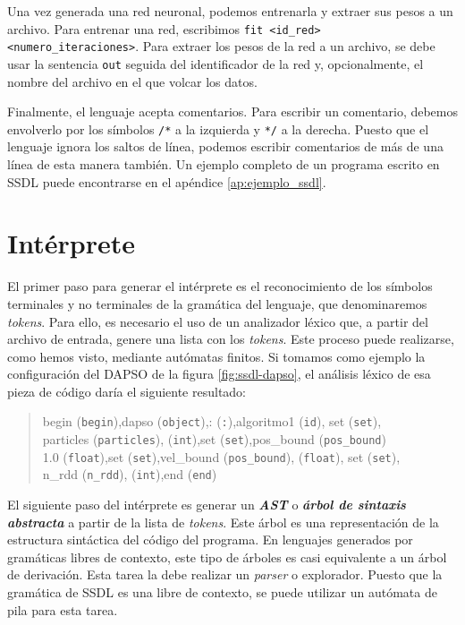 \vspace{10pt}
Una vez generada una red neuronal, podemos entrenarla y extraer sus pesos a un archivo. Para entrenar una red,
escribimos \texttt{fit <id\_red> <numero\_iteraciones>}. Para extraer los pesos de la red a un archivo, se debe
usar la sentencia \texttt{out} seguida del identificador de la red y, opcionalmente, el nombre del archivo en el
que volcar los datos.

\vspace{10pt}
Finalmente, el lenguaje acepta comentarios. Para escribir un comentario, debemos envolverlo por los símbolos
\texttt{/*} a la izquierda y \texttt{*/} a la derecha. Puesto que el lenguaje ignora los saltos de línea, podemos
escribir comentarios de más de una línea de esta manera también. Un ejemplo completo de un programa escrito en
SSDL puede encontrarse en el apéndice \ref{ap:ejemplo_ssdl}.

\section{Intérprete}

El primer paso para generar el intérprete es el reconocimiento de los símbolos terminales y no terminales de la
gramática del lenguaje, que denominaremos \textit{tokens}. Para ello, es necesario el uso de un analizador léxico 
que, a partir del archivo de entrada, genere una lista con los \textit{tokens}. Este proceso puede realizarse, como
hemos visto, mediante autómatas finitos. Si tomamos como ejemplo la configuración del DAPSO de la figura 
\ref{fig:ssdl-dapso}, el análisis léxico de esa pieza de código daría el siguiente resultado:
\begin{quote}
    begin (\texttt{begin}),\quad dapso (\texttt{object}),\quad : (\texttt{:}),\quad algoritmo1 (\texttt{id}),\quad 
    set (\texttt{set}), \\
    particles (\texttt{particles}), (\texttt{int}),\quad set (\texttt{set}),\quad pos\_bound 
    (\texttt{pos\_bound}) \\
    1.0 (\texttt{float}),\quad set (\texttt{set}),\quad vel\_bound (\texttt{pos\_bound}), (\texttt{float}),
    \quad set (\texttt{set}), \\
    n\_rdd (\texttt{n\_rdd}), (\texttt{int}),\quad end (\texttt{end})
\end{quote}
El siguiente paso del intérprete es generar un \textbf{\textit{AST}} o \textbf{\textit{árbol de sintaxis abstracta}}
a partir de la lista de \textit{tokens}. Este árbol es una representación de la estructura sintáctica del código 
del programa. En lenguajes generados por gramáticas libres de contexto, este tipo de árboles es casi equivalente a 
un árbol de derivación. Esta tarea la debe realizar un \textit{parser} o explorador. Puesto que la gramática de 
SSDL es una libre de contexto, se puede utilizar un autómata de pila para esta tarea.

